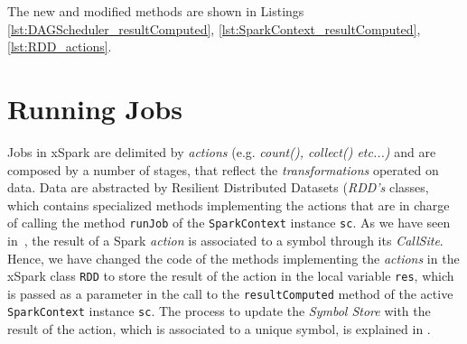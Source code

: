 The new and modified methods are shown in Listings \ref{lst:DAGScheduler_resultComputed}, \ref{lst:SparkContext_resultComputed}, \ref{lst:RDD_actions}.





\section{Running Jobs}\label{sec:running_jobs}
Jobs in xSpark are delimited by \textit{actions} (e.g. \textit{count(), collect()  etc...)} and are composed by a number of stages, that reflect the \textit{transformations} operated on data. Data are abstracted by Resilient Distributed Datasets (\textit{RDD's} classes, which contains specialized methods implementing the actions that are in charge of calling the method \texttt{runJob} of  the \texttt{SparkContext} instance \texttt{sc}. 
As we have seen in~, the result of a Spark \textit{action} is associated to a symbol through its \textit{CallSite}. Hence, we have changed the code of the methods implementing the \textit{actions} in the xSpark class \texttt{RDD} to store the result of the action in the local variable \texttt{res}, which is passed as a parameter in the call to the \texttt{resultComputed} method of the active \texttt{SparkContext} instance \texttt{sc}. The process to update the \tool \textit{Symbol Store} with the result of the action, which is associated to a unique symbol, is explained in  .  

